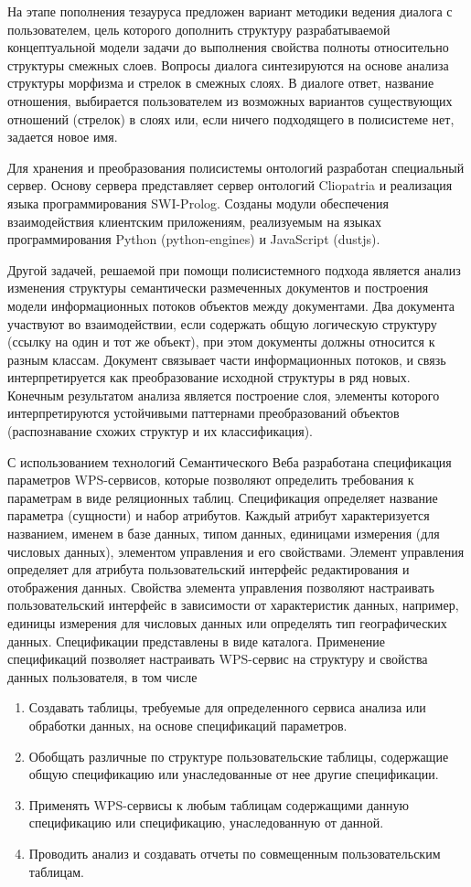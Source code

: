 \documentclass[12pt,a4paper]{ltxdoc}
\begin{document}
На этапе пополнения тезауруса предложен вариант методики ведения диалога с пользователем, цель которого дополнить структуру разрабатываемой концептуальной модели задачи до выполнения свойства полноты относительно структуры смежных слоев. Вопросы диалога синтезируются на основе анализа структуры морфизма и стрелок в смежных слоях.  В диалоге ответ, название отношения, выбирается пользователем из возможных вариантов существующих отношений (стрелок) в слоях или, если ничего подходящего в полисистеме нет, задается новое имя.

Для хранения и преобразования полисистемы онтологий разработан специальный сервер.  Основу сервера представляет сервер онтологий Cliopatria и реализация языка программирования SWI-Prolog.  Созданы модули обеспечения взаимодействия клиентским приложениям, реализуемым на языках программирования Python (python-engines) и JavaScript (dustjs).

Другой задачей, решаемой при помощи полисистемного подхода является анализ изменения структуры семантически размеченных документов и построения модели информационных потоков объектов между документами.  Два документа участвуют во взаимодействии, если  содержать общую логическую структуру (ссылку на один и тот же объект), при этом документы должны относится к разным классам.  Документ связывает части информационных потоков, и связь интерпретируется как преобразование исходной структуры в ряд новых.  Конечным результатом анализа является построение слоя, элементы которого интерпретируются устойчивыми паттернами преобразований объектов (распознавание схожих структур и их классификация).

С использованием технологий Семантического Веба разработана спецификация параметров WPS-сервисов, которые позволяют определить требования к параметрам в виде реляционных таблиц.  Спецификация определяет название параметра (сущности) и набор атрибутов. Каждый атрибут характеризуется названием, именем в базе данных, типом данных, единицами измерения (для числовых данных), элементом управления и его свойствами. Элемент управления определяет для атрибута пользовательский интерфейс редактирования и отображения данных. Свойства элемента управления позволяют настраивать пользовательский интерфейс в зависимости от характеристик данных, например, единицы измерения для числовых данных или определять тип географических данных. Спецификации представлены в виде каталога. Применение спецификаций позволяет настраивать WPS-сервис на структуру и свойства данных пользователя, в том числе
\begin{enumerate}
\item Создавать таблицы, требуемые для определенного сервиса анализа или обработки данных, на основе спецификаций параметров.
\item Обобщать различные по структуре пользовательские таблицы, содержащие общую спецификацию или унаследованные от нее другие спецификации.
\item Применять WPS-сервисы к любым таблицам содержащими данную спецификацию или спецификацию, унаследованную от данной.
\item Проводить анализ и создавать отчеты по совмещенным пользовательским таблицам.
\end{enumerate}
\end{document}
